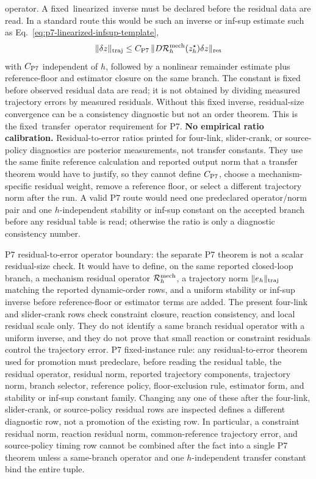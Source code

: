 \documentclass[preprint,12pt]{elsarticle}
\begin{document}
operator. A \mbox{fixed linearized inverse} must be declared before the
residual data are read. In a standard route this would be such an inverse or
inf-sup estimate such as Eq.~\eqref{eq:p7-linearized-infsup-template},
\begin{equation}
\label{eq:p7-linearized-infsup-template}
  \|\delta z\|_{\rm traj}
  \le C_{\rm P7}\,
     \|D\mathcal R_h^{\rm mech}(z_h^\star)\delta z\|_{\rm res}
\end{equation}
with \(C_{\rm P7}\) independent of \(h\), followed by a nonlinear remainder
estimate plus reference-floor and estimator closure on the same branch. The
constant is fixed before observed residual data are read; it is not obtained
by dividing measured trajectory errors by measured residuals. Without this
fixed inverse, residual-size convergence can be a consistency diagnostic but
not an order theorem.
This is the \mbox{fixed transfer operator} requirement for P7.
\noindent\textbf{No empirical ratio calibration.}
Residual-to-error ratios printed for four-link, slider-crank, or source-policy
diagnostics are posterior measurements, not transfer constants.  They use the
same finite reference calculation and reported output norm that a transfer
theorem would have to justify, so they cannot define \(C_{\rm P7}\), choose a
mechanism-specific residual weight, remove a reference floor, or select a
different trajectory norm after the run.  A valid P7 route would need one
predeclared operator/norm pair and one \(h\)-independent stability or inf-sup
constant on the accepted branch before any residual table is read; otherwise
the ratio is only a diagnostic consistency number.

P7 residual-to-error operator boundary: the separate P7 theorem is not a
scalar residual-size check. It would have to define, on the same reported
closed-loop branch, a mechanism residual operator
\(\mathcal R_h^{\rm mech}\), a trajectory norm \(\|e_h\|_{\rm traj}\)
matching the reported dynamic-order rows, and a uniform stability or inf-sup
inverse before reference-floor or estimator terms are added. The present
four-link and slider-crank rows check constraint closure, reaction
consistency, and local residual scale only. They do not identify a same branch
residual operator with a uniform inverse, and they do not prove that small
reaction or constraint residuals control the trajectory error.
P7 fixed-instance rule: any residual-to-error theorem used for promotion must predeclare,
before reading the residual table, the residual operator, residual norm,
reported trajectory components, trajectory norm, branch selector, reference
policy, floor-exclusion rule, estimator form, and stability or inf-sup
constant family. Changing any one of these after the four-link, slider-crank,
or source-policy residual rows are inspected defines a different diagnostic
row, not a promotion of the existing row. In particular, a constraint residual
norm, reaction residual norm, common-reference trajectory error, and
source-policy timing row cannot be combined after the fact into a single
P7 theorem unless a same-branch operator and one \(h\)-independent transfer
constant bind the entire tuple.
\end{document}
